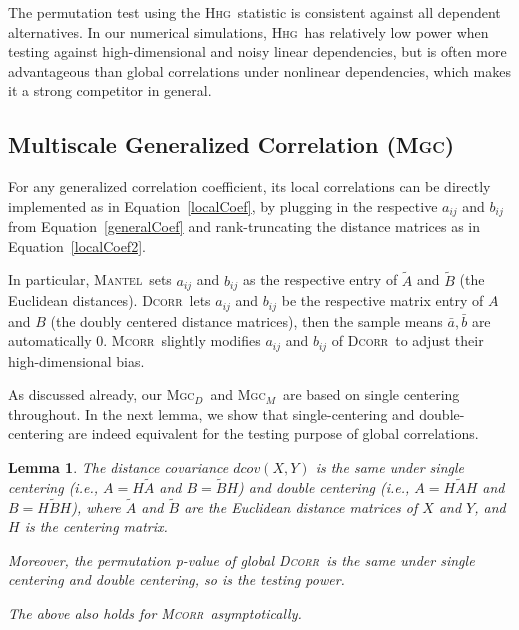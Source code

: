 \documentclass[11pt]{article}
\newcommand{\note}[2][]{\added[#1,remark={#2}]{}}
\providecommand{\sct}[1]{{\normalfont\textsc{#1}}}
\newcommand{\Mgc}{\sct{Mgc}}
\newcommand{\Mgcd}{\sct{Mgc$_D$}}
\newcommand{\Mgcm}{\sct{Mgc$_M$}}
\newcommand{\Hhg}{\sct{Hhg}}
\newcommand{\Dcorr}{\sct{Dcorr}}
\newcommand{\Mcorr}{\sct{Mcorr}}
\newcommand{\Mantel}{\sct{Mantel}}
\newcommand{\cs}[1]{{\note{cs: #1}}}
\newtheorem{lem}{Lemma}
\begin{document}
The permutation test using the \Hhg~statistic is consistent against all dependent alternatives. In our numerical simulations, \Hhg~has relatively low power  when testing against high-dimensional and noisy linear dependencies, but is often more advantageous than global correlations under nonlinear dependencies, which makes it a strong competitor in general.

\subsection{Multiscale Generalized Correlation (\Mgc)}
\label{appen:mgc}
For any generalized correlation coefficient, its local correlations can be directly implemented as in Equation~\ref{localCoef}, by plugging in the respective $a_{ij}$ and $b_{ij}$ from Equation~\ref{generalCoef} and rank-truncating  the distance matrices  as in Equation~\ref{localCoef2}. 

In particular, \Mantel~sets $a_{ij}$ and $b_{ij}$ as the respective entry of $\tilde{A}$ and $\tilde{B}$ (the Euclidean distances). \Dcorr~lets $a_{ij}$ and $b_{ij}$ be the respective matrix entry of $A$ and $B$ (the doubly centered distance matrices), then the sample means $\bar{a}, \bar{b}$ are automatically $0$. \Mcorr~slightly modifies $a_{ij}$ and $b_{ij}$ of \Dcorr~to adjust their high-dimensional bias. 

As discussed already, our \Mgcd~and \Mgcm~are based on single centering throughout. 
In the next lemma, we show that single-centering and double-centering are indeed equivalent for the testing purpose of global correlations.
\begin{lem}
The distance covariance $dcov(X,Y)$ is the same under single centering (i.e., $A=H\tilde{A}$ and $B=\tilde{B}H$) and double centering (i.e., $A=H\tilde{A}H$ and $B=H\tilde{B}H$), where $\tilde{A}$ and $\tilde{B}$ are the Euclidean distance matrices of $X$ and $Y$, and $H$ is the centering matrix. 

Moreover, the permutation p-value of global \Dcorr~is the same under single centering and double centering, so is the testing power.

The above also holds for \Mcorr~asymptotically.
\end{lem}
\cs{this lemma seems to be in the wrong place? it has nothing to do with \Mgc? i would move it and change corresponding text}
\end{document}
